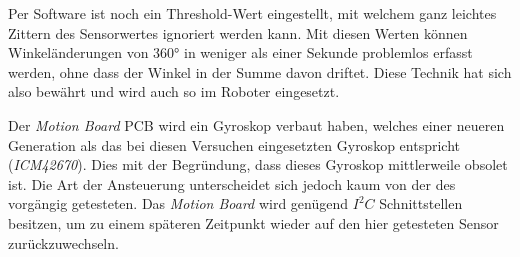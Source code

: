 \documentclass[main.tex]{subfiles} %
\begin{document}
Per Software ist noch ein Threshold-Wert eingestellt, mit welchem ganz leichtes
Zittern des Sensorwertes ignoriert werden kann. Mit diesen Werten können
Winkeländerungen von 360° in weniger als einer Sekunde problemlos erfasst
werden, ohne dass der Winkel in der Summe davon driftet. Diese Technik hat sich
also bewährt und wird auch so im Roboter eingesetzt.

Der \textit{Motion Board} PCB wird ein Gyroskop verbaut haben, welches einer
neueren Generation als das bei diesen Versuchen eingesetzten Gyroskop
entspricht (\textit{ICM42670}). Dies mit der Begründung, dass dieses Gyroskop
mittlerweile obsolet ist. Die Art der Ansteuerung unterscheidet sich jedoch
kaum von der des vorgängig getesteten. Das \textit{Motion Board} wird genügend
$I^2C$ Schnittstellen besitzen, um zu einem späteren Zeitpunkt wieder auf den
hier getesteten Sensor zurückzuwechseln.
\end{document}
